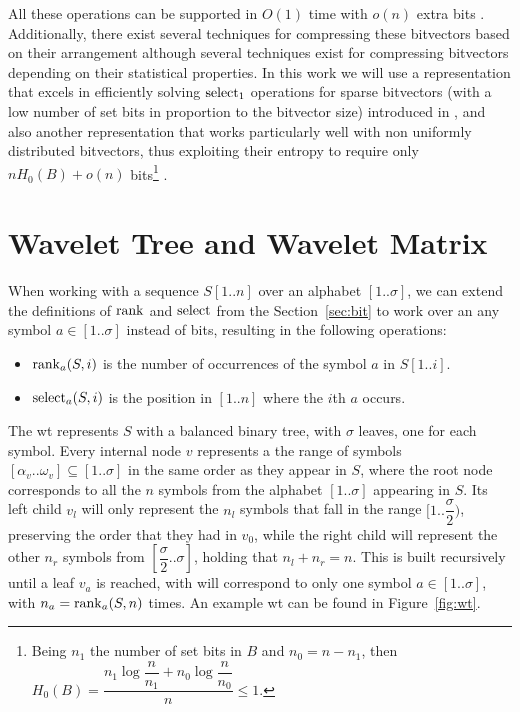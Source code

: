 \documentclass[a4paper,10pt,twoside]{book}
\begin{document}
    All these operations can be supported in $O(1)$ time with $o(n)$ extra bits \cite{Jac89,Mun96}. 
    Additionally, there exist several techniques for compressing these bitvectors based on their arrangement although several techniques exist for compressing bitvectors depending on their statistical properties. In this work we will use a representation that excels in efficiently solving $\operatorname{select}_1$ operations for sparse bitvectors (with a low number of set bits in proportion to the bitvector size) introduced in \cite{okanohara2007practical}, and also another representation that works particularly well with non uniformly distributed bitvectors, thus exploiting their entropy to require only $nH_0(B) + o(n)$ bits\footnote{Being $n_1$ the number of set bits in $B$ and $n_0 = n - n_1$, then $H_0(B) = \dfrac{n_1\log\dfrac{n}{n_1} + n_0\log\dfrac{n}{n_0}}{n} \leq 1$.} \cite{Raman:2002:SID:545381.545411}.
	
	\section{Wavelet Tree and Wavelet Matrix}
	\label{sec:wt}
	When working with a sequence $S[1..n]$ over an alphabet $[1..\sigma]$, we can extend the definitions of $\operatorname{rank}$ and $\operatorname{select}$ from the Section~\ref{sec:bit} to work over an any symbol $a \in [1..\sigma]$ instead of bits, resulting in the following operations:
	
	\begin{itemize}
	    \item $\operatorname{rank}_a(S,i)$ is the number of occurrences of the symbol $a$ in $S[1..i]$.
	    \item $\operatorname{select}_a(S,i)$ is the position in $[1..n]$ where the $i$th $a$ occurs.
	\end{itemize}
	
    The \gls{wt} \cite{WT03} represents $S$ with a balanced binary tree, with $\sigma$ leaves, one for each symbol. Every internal node $v$ represents a the range of symbols $[\alpha_v..\omega_v] \subseteq [1..\sigma]$ in the same order as they appear in $S$, where the root node corresponds to all the $n$ symbols from the alphabet $[1..\sigma]$ appearing in $S$. Its left child $v_l$ will only represent the $n_l$ symbols that fall in the range $[1..\dfrac{\sigma}{2})$, preserving the order that they had in $v_0$, while the right child will represent the other $n_r$ symbols from $[\dfrac{\sigma}{2}..\sigma]$, holding that $n_l+n_r=n$. This is built recursively until a leaf $v_a$ is reached, with will correspond to only one symbol $a \in [1..\sigma]$, with $n_a = \operatorname{rank}_a(S,n)$ times. An example \gls{wt} can be found in Figure~\ref{fig:wt}.
    
\end{document}
